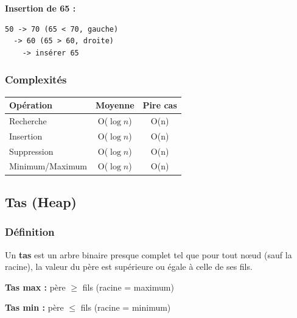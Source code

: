\documentclass[12pt,a4paper]{article}
\begin{document}
\begin{exemple}
\textbf{Insertion de 65 :}
\begin{verbatim}
50 -> 70 (65 < 70, gauche)
  -> 60 (65 > 60, droite)
    -> insérer 65
\end{verbatim}
\end{exemple}

\subsubsection{Complexités}

\begin{center}
\colorbox{fondbleu}{
\begin{tabular}{|l|c|c|}
\hline
\rowcolor{titrebleu!30}
\textbf{Opération} & \textbf{Moyenne} & \textbf{Pire cas} \\
\hline
Recherche & \textcolor{defvert}{O($\log n$)} & \textcolor{importantrouge}{O(n)} \\
Insertion & \textcolor{defvert}{O($\log n$)} & \textcolor{importantrouge}{O(n)} \\
Suppression & \textcolor{defvert}{O($\log n$)} & \textcolor{importantrouge}{O(n)} \\
Minimum/Maximum & \textcolor{defvert}{O($\log n$)} & \textcolor{importantrouge}{O(n)} \\
\hline
\end{tabular}}
\end{center}

\newpage
\subsection{Tas (Heap)}

\subsubsection{Définition}

\begin{definition}
Un \textbf{tas} est un arbre binaire presque complet tel que pour tout nœud (sauf la racine), la valeur du père est supérieure ou égale à celle de ses fils.

\textbf{Tas max :} père $\geq$ fils (racine = maximum)

\textbf{Tas min :} père $\leq$ fils (racine = minimum)
\end{definition}
\end{document}
